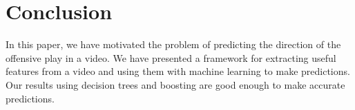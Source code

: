 \documentclass{article} %
\begin{document}
\section{Conclusion}

In this paper, we have motivated the problem of predicting the direction of the offensive play in a video. We have presented a framework for extracting useful features from a video and using them with machine learning to make predictions. Our results using decision trees and boosting are good enough to make accurate predictions.

%
%
%
%
%
%
%
\end{document}
